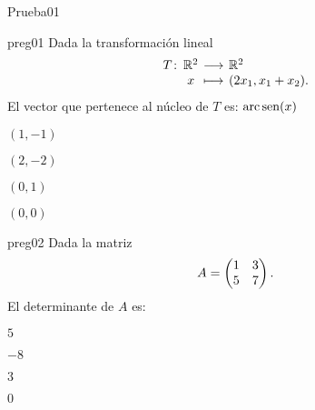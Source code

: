 \documentclass[10pt]{article}
\begin{document}
\begin{quiz}{Prueba01}

\begin{multi}{preg01}
    Dada la transformación lineal
    \[
        \funcion{T}{\R^2}{\R^2}{x}{(2x_1,x_1+x_2).}
    \]
    El vector que pertenece al núcleo de $T$ es: $\operatorname{arc\,sen}(x)$
    \item $(1,-1)$
    \item $(2,-2)$
    \item $(0,1)$
    \item* $(0,0)$
\end{multi}

\begin{multi}{preg02}
    Dada la matriz 
    \[
        A=
        \begin{pmatrix}
        1&3\cr
        5&7
        \end{pmatrix}.
    \]
    El determinante de $A$ es:
    \item $5$
    \item* $-8$
    \item $3$
    \item $0$
\end{multi}

\end{quiz}
\end{document}
